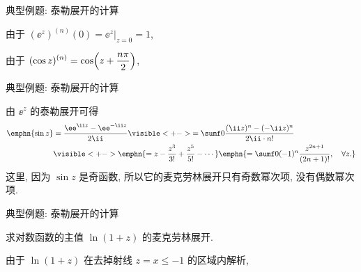 \begin{frame}{典型例题: 泰勒展开的计算}
	\onslide<+->
	\begin{example}
		由于 $(\ee^z)^{(n)}(0)=\ee^z|_{z=0}=1$,
		\bigdel
	\end{example}

	\onslide<+->
	\begin{example}
		由于 $\displaystyle(\cos z)^{(n)}=\cos\Bigl(z+\dfrac{n\pi}2\Bigr)$,
		\onslide<+->{%
			\[
				(\cos z)^{(2n+1)}(0)=0,\quad (\cos z)^{(2n)}(0)=(-1)^n,
			\]
		}\bigdel
	\end{example}
\end{frame}


\begin{frame}{典型例题: 泰勒展开的计算}
	\onslide<+->
	\begin{example}
		由 $\ee^z$ 的泰勒展开可得
		\begin{align*}
			\emphn{\sin z}&=\frac{\ee^{\ii z}-\ee^{-\ii z}}{2\ii}
			\visible<+->{=\sumf0\frac{(\ii z)^n-(-\ii z)^n}{2\ii\cdot n!}}\\
			&\visible<+->{\emphn{=z-\frac{z^3}{3!}+\frac{z^5}{5!}-\cdots}
			\emphn{=\sumf0(-1)^n\frac{z^{2n+1}}{(2n+1)!},\quad\forall z.}}
		\end{align*}
		\onslide<+->
		这里, 因为 $\sin z$ 是奇函数, 所以它的麦克劳林展开只有奇数幂次项, 没有偶数幂次项.
	\end{example}
\end{frame}


\begin{frame}{典型例题: 泰勒展开的计算}
	\onslide<+->
	\begin{example}[nearnext]
		求对数函数的主值 $\ln(1+z)$ 的麦克劳林展开.
	\end{example}
	\onslide<+->
	\begin{solution}[nearprev]
		由于 $\ln(1+z)$ 在去掉射线 $z=x\le-1$ 的区域内解析,
		\bigdel
	\end{solution}
\end{frame}


